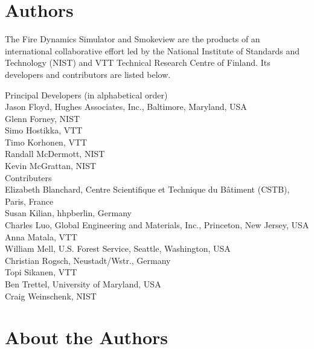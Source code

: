 \chapter{Authors}

The Fire Dynamics Simulator and Smokeview are the products of an international collaborative effort led by
the National Institute of Standards and Technology (NIST) and VTT Technical Research Centre of Finland. Its developers and
contributors are listed below.

\vspace{0.5in}

\begin{flushleft}

Principal Developers (in alphabetical order) \\ [0.2in]

Jason Floyd, Hughes Associates, Inc., Baltimore, Maryland, USA \\
Glenn Forney, NIST \\
Simo Hostikka, VTT \\
Timo Korhonen, VTT  \\
Randall McDermott, NIST \\
Kevin McGrattan, NIST \\ [0.5in]

Contributers \\ [0.2in]

Elizabeth Blanchard, Centre Scientifique et Technique du B\^{a}timent (CSTB), Paris, France \\
Susan Kilian, hhpberlin, Germany \\
Charles Luo, Global Engineering and Materials, Inc., Princeton, New Jersey, USA \\
Anna Matala, VTT \\
William Mell, U.S. Forest Service, Seattle, Washington, USA \\
Christian Rogsch, Neustadt/Wstr., Germany \\
Topi Sikanen, VTT \\
Ben Trettel, University of Maryland, USA \\
Craig Weinschenk, NIST

\end{flushleft}


\chapter{About the Authors}

